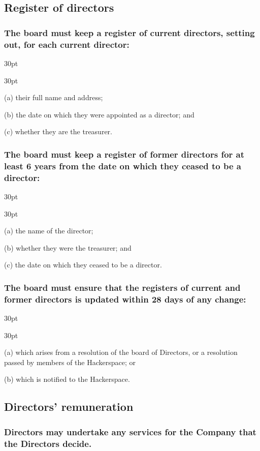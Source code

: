 \documentclass[12pt]{article}
\def\clauseindent{30pt}
\newenvironment{subindentlist}{\begin{adjustwidth}{\clauseindent}{}\begin{labeledlist}{\clauseindent}}{\end{labeledlist}\end{adjustwidth}}
\begin{document}
\subsection{Register of directors}
\subsubsection{The board must keep a register of current directors, setting out, for each current director:}
\begin{subindentlist}
    \item [(a)] their full name and address;
    \item [(b)] the date on which they were appointed as a director; and
    \item [(c)] whether they are the treasurer.
\end{subindentlist}
\subsubsection{The board must keep a register of former directors for at least 6 years from the date on which they ceased to be a director:}
\begin{subindentlist}
    \item [(a)] the name of the director;
    \item [(b)] whether they were the treasurer; and
    \item [(c)] the date on which they ceased to be a director.
\end{subindentlist}
\subsubsection{The board must ensure that the registers of current and former directors is updated within 28 days of any change:}
\begin{subindentlist}
    \item [(a)] which arises from a resolution of the board of Directors, or a resolution passed by members of the Hackerspace; or
    \item [(b)] which is notified to the Hackerspace.
\end{subindentlist}

\subsection{Directors’ remuneration}
\subsubsection{Directors may undertake any services for the Company that the Directors decide.}
\end{document}
